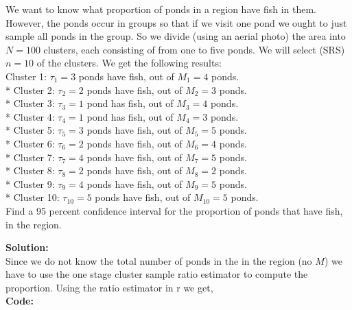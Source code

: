 \documentclass[12pt]{article}
\makeatletter
\theoremstyle{homework}
\newenvironment{exercise}[1]
{\def\@currentlabel{#1}\exercisecore}
{\endexercisecore}
\newcommand{\localhead}[1]{\par\smallskip\noindent\textbf{#1}\nobreak\\}%
\newcommand\solution{\localhead{Solution:}}
\makeatother
\begin{document}
\begin{exercise}{1}We want to know what proportion of ponds in a region have fish in them. However, 
  the ponds occur in groups so that if we visit one pond we ought to just sample all ponds in the 
  group. So we divide (using an aerial photo) the area into $N = 100$ clusters, each consisting of 
  from one to five ponds. We will select (SRS) $n = 10$ of the clusters. We get the following results:\\

\noindent * Cluster 1: $\tau_1 = 3$ ponds have fish, out of $M_1 = 4$ ponds.\\
* Cluster 2: $\tau_2 = 2$ ponds have fish, out of $M_2 = 3$ ponds.  \\
* Cluster 3: $\tau_3 = 1$ pond has fish, out of $M_3 = 4$ ponds. \\
* Cluster 4: $\tau_4 = 1$ pond has fish, out of $M_4 = 3$ ponds. \\
* Cluster 5: $\tau_5 = 3$ ponds have fish, out of $M_5 = 5$ ponds. \\
* Cluster 6: $\tau_6 = 2$ ponds have fish, out of $M_6 = 4$ ponds. \\
* Cluster 7: $\tau_7 = 4$ ponds have fish, out of $M_7 = 5$ ponds. \\
* Cluster 8: $\tau_8 = 2$ ponds have fish, out of $M_8 = 2$ ponds. \\
* Cluster 9: $\tau_9 = 4$ ponds have fish, out of $M_9 = 5$ ponds. \\
* Cluster 10: $\tau_{10} = 5$ ponds have fish, out of $M_{10} = 5$ ponds.\\

Find a 95 percent confidence interval for the proportion of ponds that have fish, in the region.\\
\solution Since we do not know the total number of ponds in the in the region (no $M$) we have to use the 
one stage cluster sample ratio estimator to compute the proportion. Using the ratio estimator in r we get,\\ 
\textbf{Code:}
\begin{center}
   
\end{center}
\end{exercise}
\vspace{1in}
\end{document}
